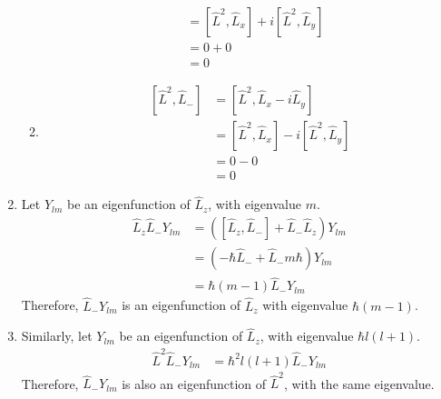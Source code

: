 \documentclass[fleqn, a4paper, 11pt, oneside]{amsart}
\theoremstyle{definition}
\theoremstyle{theorem}
\begin{document}
\begin{solution}
\begin{enumerate}[leftmargin=*]
\begin{enumerate}[leftmargin=*]
\begin{align*}
                                                                                   & = \left[ \hat{L}^2,\hat{L}_x \right] + i \left[ \hat{L}^2,\hat{L}_y \right] \\
                                                                                   & = 0 + 0                                                                     \\
                                                                                   & = 0
					\end{align*}
				\item
					\begin{align*}
						\left[ \hat{L}^2,\hat{L}_- \right] & = \left[ \hat{L}^2,\hat{L}_x - i \hat{L}_y \right]                          \\
                                                                                   & = \left[ \hat{L}^2,\hat{L}_x \right] - i \left[ \hat{L}^2,\hat{L}_y \right] \\
                                                                                   & = 0 - 0                                                                     \\
                                                                                   & = 0
					\end{align*}
			\end{enumerate}
		\item
			Let $Y_{l m}$ be an eigenfunction of $\hat{L}_z$, with eigenvalue $m$.
			\begin{align*}
				\hat{L}_z \hat{L}_- Y_{l m} & = \left( \left[ \hat{L}_z,\hat{L}_- \right] + \hat{L}_- \hat{L}_z \right) Y_{l m} \\
                                                            & = \left( -\hbar \hat{L}_- + \hat{L}_- m \hbar \right) Y_{l m}                     \\
                                                            & = \hbar (m - 1) \hat{L}_- Y_{l m}
			\end{align*}
			Therefore, $\hat{L}_- Y_{l m}$ is an eigenfunction of $\hat{L}_z$ with eigenvalue $\hbar (m - 1)$.
		\item
			Similarly, let $Y_{l m}$ be an eigenfunction of $\hat{L}_z$, with eigenvalue $\hbar l (l + 1)$.
			\begin{align*}
				\hat{L}^2 \hat{L}_- Y_{l m} & = \hbar^2 l (l + 1) \hat{L}_- Y_{l m}
			\end{align*}
			Therefore, $\hat{L}_- Y_{l m}$ is also an eigenfunction of $\hat{L}^2$, with the same eigenvalue.
	\end{enumerate}
\end{solution}
\end{document}
